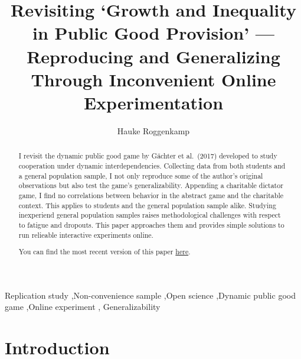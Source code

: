 \documentclass[
  authoryear,
  preprint,
  3p]{elsarticle}
\begin{document}
\begin{frontmatter}
\title{Revisiting `Growth and Inequality in Public Good Provision'
---Reproducing and Generalizing Through Inconvenient Online
Experimentation}
\author[1,2]{Hauke Roggenkamp%
%
}



        
\begin{abstract}
I revisit the dynamic public good game by Gächter et al.~(2017)
developed to study cooperation under dynamic interdependencies.
Collecting data from both students and a general population sample, I
not only reproduce some of the author's original observations but also
test the game's generalizability. Appending a charitable dictator game,
I find no correlations between behavior in the abstract game and the
charitable context. This applies to students and the general population
sample alike. Studying inexperiend general population samples raises
methodological challenges with respect to fatigue and dropouts. This
paper approaches them and provides simple solutions to run relieable
interactive experiments online.

You can find the most recent version of this paper
\href{https://github.com/Howquez/coopUncertainty/blob/main/analysis/quarto/paper.pdf}{here}.
\end{abstract}





\begin{keyword}
    Replication study \sep Non-convenience sample \sep Open
science \sep Dynamic public good game \sep Online experiment \sep 
    Generalizability
\end{keyword}
\end{frontmatter}\ifdefined\Shaded\renewenvironment{Shaded}{\begin{tcolorbox}[breakable, borderline west={3pt}{0pt}{shadecolor}, enhanced, interior hidden, boxrule=0pt, sharp corners, frame hidden]}{\end{tcolorbox}}\fi

\hypertarget{sec-intro}{%
\section{Introduction}\label{sec-intro}}
\end{document}
